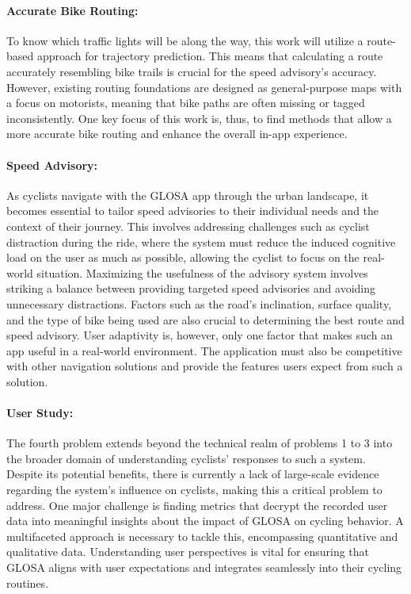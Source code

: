 \paragraph{Accurate Bike Routing:} To know which traffic lights will be along the way, this work will utilize a route-based approach for trajectory prediction. This means that calculating a route accurately resembling bike trails is crucial for the speed advisory's accuracy. However, existing routing foundations are designed as general-purpose maps with a focus on motorists, meaning that bike paths are often missing or tagged inconsistently. One key focus of this work is, thus, to find methods that allow a more accurate bike routing and enhance the overall in-app experience. 

\paragraph{Speed Advisory:} As cyclists navigate with the GLOSA app through the urban landscape, it becomes essential to tailor speed advisories to their individual needs and the context of their journey. This involves addressing challenges such as cyclist distraction during the ride, where the system must reduce the induced cognitive load on the user as much as possible, allowing the cyclist to focus on the real-world situation. Maximizing the usefulness of the advisory system involves striking a balance between providing targeted speed advisories and avoiding unnecessary distractions. Factors such as the road's inclination, surface quality, and the type of bike being used are also crucial to determining the best route and speed advisory. User adaptivity is, however, only one factor that makes such an app useful in a real-world environment. The application must also be competitive with other navigation solutions and provide the features users expect from such a solution.

\paragraph{User Study:} The fourth problem extends beyond the technical realm of problems 1 to 3 into the broader domain of understanding cyclists' responses to such a system. Despite its potential benefits, there is currently a lack of large-scale evidence regarding the system's influence on cyclists, making this a critical problem to address. One major challenge is finding metrics that decrypt the recorded user data into meaningful insights about the impact of GLOSA on cycling behavior. A multifaceted approach is necessary to tackle this, encompassing quantitative and qualitative data. Understanding user perspectives is vital for ensuring that GLOSA aligns with user expectations and integrates seamlessly into their cycling routines. 

